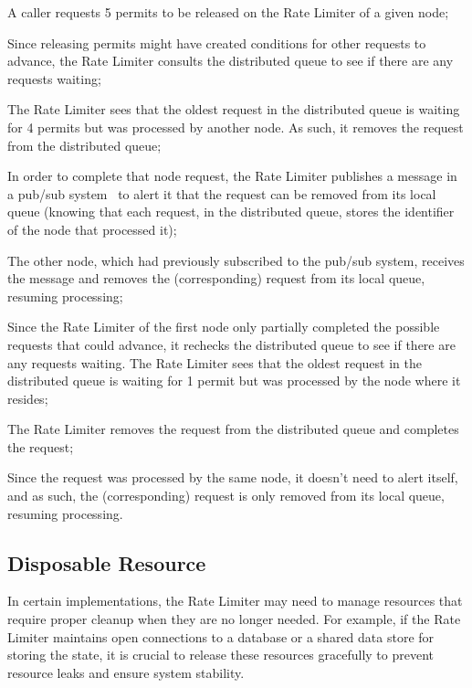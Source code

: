 \begin{boldenumerate}
    \item A caller requests 5 permits to be released on the Rate Limiter of a given node;
    \item Since releasing permits might have created conditions for other requests to advance, the Rate Limiter consults the distributed queue to see if there are any requests waiting;
    \item The Rate Limiter sees that the oldest request in the distributed queue is waiting for 4 permits but was processed by another node.
    As such, it removes the request from the distributed queue;
    \item In order to complete that node request, the Rate Limiter publishes a message in a pub/sub system~\cite{microsoft-pub-sub-pattern} to alert it that the request can be removed from its local queue (knowing that each request, in the distributed queue,
    stores the identifier of the node that processed it);
    \item The other node, which had previously subscribed to the pub/sub system, receives the message and removes the (corresponding) request from its local queue, resuming processing;
    \item Since the Rate Limiter of the first node only partially completed the possible requests that could advance, it rechecks the distributed queue to see if there are any requests waiting.
    The Rate Limiter sees that the oldest request in the distributed queue is waiting for 1 permit
    but was processed by the node where it resides;
    \item The Rate Limiter removes the request from the distributed queue and completes the request;
    \item Since the request was processed by the same node, it doesn't need to alert itself, and as such, the (corresponding) request is only removed from its local queue, resuming processing.
\end{boldenumerate}

\subsection{Disposable Resource}\label{subsec:rate-limiter-disposable-resource}

In certain implementations, the Rate Limiter may need to manage resources that require proper cleanup when they are no longer needed.
For example, if the Rate Limiter maintains open connections to a database or a shared data store
for storing the state, it is crucial to release these resources gracefully to prevent resource leaks and ensure system stability.

